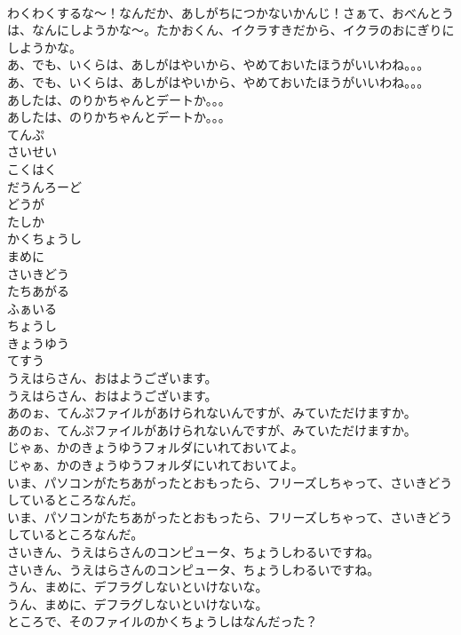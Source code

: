 \documentclass[8pt]{extreport}
\begin{document}
\begin{CJK}{UTF8}{min}
\\	わくわくするな～！なんだか、あしがちにつかないかんじ！さぁて、おべんとうは、なんにしようかな～。たかおくん、イクラすきだから、イクラのおにぎりにしようかな。
\\	あ、でも、いくらは、あしがはやいから、やめておいたほうがいいわね。。。
\\	あ、でも、いくらは、あしがはやいから、やめておいたほうがいいわね。。。
\\	あしたは、のりかちゃんとデートか。。。
\\	あしたは、のりかちゃんとデートか。。。
\\	てんぷ
\\	さいせい
\\	こくはく
\\	だうんろーど
\\	どうが
\\	たしか
\\	かくちょうし
\\	まめに
\\	さいきどう
\\	たちあがる
\\	ふぁいる
\\	ちょうし
\\	きょうゆう
\\	てすう
\\	うえはらさん、おはようございます。
\\	うえはらさん、おはようございます。
\\	あのぉ、てんぷファイルがあけられないんですが、みていただけますか。
\\	あのぉ、てんぷファイルがあけられないんですが、みていただけますか。
\\	じゃぁ、かのきょうゆうフォルダにいれておいてよ。
\\	じゃぁ、かのきょうゆうフォルダにいれておいてよ。
\\	いま、パソコンがたちあがったとおもったら、フリーズしちゃって、さいきどうしているところなんだ。
\\	いま、パソコンがたちあがったとおもったら、フリーズしちゃって、さいきどうしているところなんだ。
\\	さいきん、うえはらさんのコンピュータ、ちょうしわるいですね。
\\	さいきん、うえはらさんのコンピュータ、ちょうしわるいですね。
\\	うん、まめに、デフラグしないといけないな。
\\	うん、まめに、デフラグしないといけないな。
\\	ところで、そのファイルのかくちょうしはなんだった？

\end{CJK}
\end{document}
